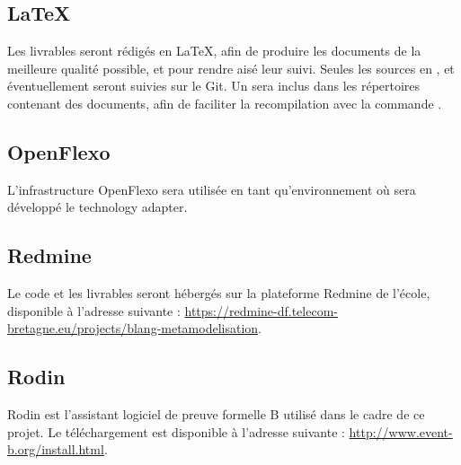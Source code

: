 \documentclass{article}
\begin{document}
\subsection{\LaTeX}

Les livrables seront rédigés en \LaTeX, afin de produire les documents de la meilleure qualité possible, et pour rendre aisé leur suivi.
Seules les sources en ,  et éventuellement  seront suivies sur le Git.
Un  sera inclus dans les répertoires contenant des documents, afin de faciliter la recompilation avec la commande .

\subsection{OpenFlexo}

L'infrastructure OpenFlexo sera utilisée en tant qu'environnement où sera développé le technology adapter.

\subsection{Redmine}

Le code et les livrables seront hébergés sur la plateforme Redmine de l'école, disponible à l'adresse suivante : \href{%
https://redmine-df.telecom-bretagne.eu/projects/blang-metamodelisation}{https://redmine-df.telecom-bretagne.eu/projects/blang-metamodelisation}.

\subsection{Rodin}

Rodin est l'assistant logiciel de preuve formelle B utilisé dans le cadre de ce projet.
Le téléchargement est disponible à l'adresse suivante : \href{http://www.event-b.org/install.html}{http://www.event-b.org/install.html}.


\newpage

\nocite{*}

\printbibheading[title=Références, heading=bibintoc]

\printbibliography[keyword=bmethod, heading=subbibintoc, title={Méthode B}]

\printbibliography[keyword=rodin, heading=subbibintoc, title={Rodin}]

\printbibliography[keyword=openflexo, heading=subbibintoc, title={OpenFlexo}]
\end{document}
